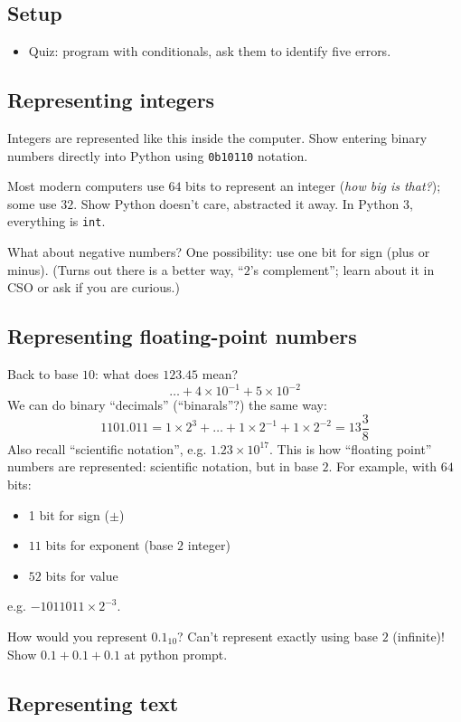 \documentclass{article}
\begin{document}
\subsection*{Setup}
\begin{itemize}
\item Quiz: program with conditionals, ask them to identify five
  errors.
\end{itemize}

\subsection*{Representing integers}

Integers are represented like this inside the computer.  Show entering
binary numbers directly into Python using \verb|0b10110| notation.

Most modern computers use $64$ bits to represent an integer (\emph{how
  big is that?}); some use $32$. Show Python doesn't care, abstracted
it away.  In Python 3, everything is \texttt{int}.

What about negative numbers?  One possibility: use one bit for sign
(plus or minus).  (Turns out there is a better way, ``$2$'s
complement''; learn about it in CSO or ask if you are curious.)

\subsection*{Representing floating-point numbers}

Back to base $10$: what does $123.45$ mean?
\[ \dots + 4 \times 10^{-1} + 5 \times 10^{-2} \]
We can do binary ``decimals'' (``binarals''?) the same way: \[
1101.011 = 1 \times 2^3 + \dots + 1 \times 2^{-1} + 1 \times 2^{-2} =
13 \frac{3}{8} \]  Also recall ``scientific notation'', e.g. $1.23
\times 10^{17}$.  This is how ``floating point'' numbers are
represented: scientific notation, but in base $2$.  For example, with
$64$ bits:
\begin{itemize}
\item 1 bit for sign ($\pm$)
\item $11$ bits for exponent (base $2$ integer)
\item $52$ bits for value
\end{itemize}
e.g. $-1011011 \times 2^{-3}$.

How would you represent $0.1_{10}$?  Can't represent exactly using
base $2$ (infinite)! Show $0.1 + 0.1 + 0.1$ at python prompt.

\subsection*{Representing text}
\end{document}
